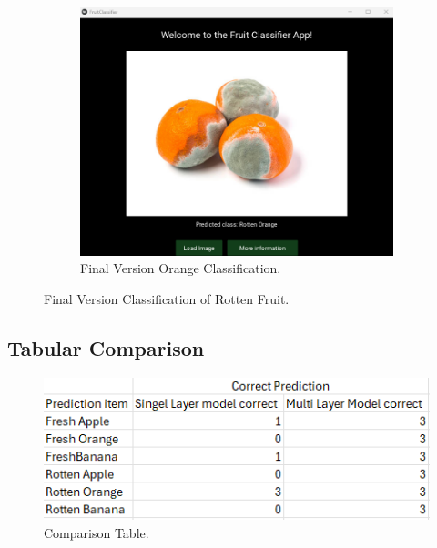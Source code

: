 \documentclass[conference]{IEEEtran}
\begin{document}
\begin{figure}[h]
\begin{subfigure}[b]{0.48\linewidth}
        \includegraphics[width=\linewidth]{Mlayer orageR3.png}
        \caption{Final Version Orange Classification.}
        \label{figFB}
    \end{subfigure}
    \caption{Final Version Classification of Rotten Fruit.}
    \label{FigMR}
\end{figure}

\subsection{Tabular Comparison}

\begin{figure}[h]
    \centering
    \includegraphics[width=\linewidth]{Ek wil huil.png}
    \caption{Comparison Table.}
    \label{figSl}
\end{figure}
\end{document}
